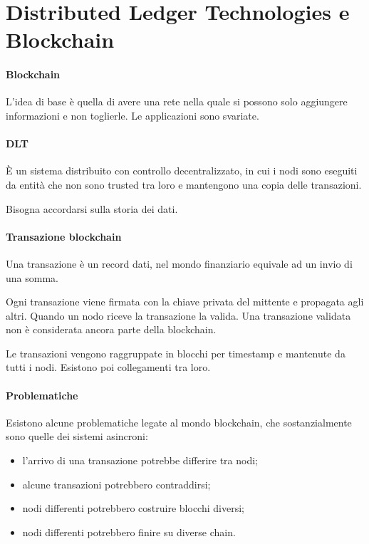 \section{Distributed Ledger Technologies e Blockchain}

\paragraph{Blockchain}
L'idea di base è quella di avere una rete nella quale 
si possono solo aggiungere informazioni e non toglierle. 
Le applicazioni sono svariate.

\paragraph{DLT}
È un sistema distribuito con controllo decentralizzato, in cui i 
nodi sono eseguiti da entità che non sono trusted tra loro 
e mantengono una copia delle transazioni.

Bisogna accordarsi sulla storia dei dati.

\paragraph{Transazione blockchain}
Una transazione è un record dati, nel mondo finanziario
equivale ad un invio di una somma.

Ogni transazione viene firmata con la chiave privata del mittente e propagata 
agli altri. 
Quando un nodo riceve la transazione la valida. Una transazione validata non 
è considerata ancora parte della blockchain.

Le transazioni vengono raggruppate in blocchi per timestamp e mantenute 
da tutti i nodi. Esistono poi collegamenti tra loro.

\paragraph{Problematiche}
Esistono alcune problematiche legate al mondo blockchain, che sostanzialmente 
sono quelle dei sistemi asincroni:
\begin{itemize}
    \item l'arrivo di una transazione potrebbe differire tra nodi;
    \item alcune transazioni potrebbero contraddirsi;
    \item nodi differenti potrebbero costruire blocchi diversi;
    \item nodi differenti potrebbero finire su diverse chain.
\end{itemize}

